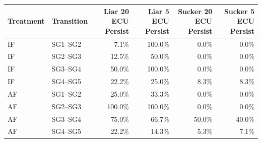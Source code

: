 \begin{tabular}{llrrrr}
  \toprule
  Treatment & Transition & Liar 20 ECU Persist & Liar 5 ECU Persist & Sucker 20 ECU Persist & Sucker 5 ECU Persist \\ 
  \midrule
  IF & SG1--SG2 & 7.1\% & 100.0\% & 0.0\% & 0.0\% \\ 
  IF & SG2--SG3 & 12.5\% & 50.0\% & 0.0\% & 0.0\% \\ 
  IF & SG3--SG4 & 50.0\% & 100.0\% & 0.0\% & 0.0\% \\ 
  IF & SG4--SG5 & 22.2\% & 25.0\% & 8.3\% & 8.3\% \\ 
  AF & SG1--SG2 & 25.0\% & 33.3\% & 0.0\% & 0.0\% \\ 
  AF & SG2--SG3 & 100.0\% & 100.0\% & 0.0\% & 0.0\% \\ 
  AF & SG3--SG4 & 75.0\% & 66.7\% & 50.0\% & 40.0\% \\ 
  AF & SG4--SG5 & 22.2\% & 14.3\% & 5.3\% & 7.1\% \\ 
  \bottomrule
\end{tabular}
